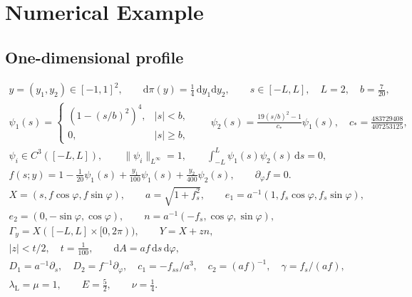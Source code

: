 \section{Numerical Example}
\label{sec:numerical-example}
\subsection{One-dimensional profile}
\begin{gather}
 y=(y_1,y_2)\in[-1,1]^2,\qquad
 \mathrm{d}\pi(y)=\tfrac14\,\mathrm{d}y_1\mathrm{d}y_2,
 \qquad s\in[-L,L],\quad L=2,\quad b=\tfrac7{20},\\
 \psi_1(s)=\begin{cases}(1-(s/b)^2)^4,&|s|<b,\\0,&|s|\ge b,\end{cases}
 \qquad
 \psi_2(s)=\frac{19(s/b)^2-1}{c_*}\psi_1(s),
 \quad c_*=\frac{483729408}{407253125},\\
 \psi_i\in C^3([-L,L]),\qquad
 \|\psi_i\|_{L^\infty}=1,\qquad
 \int_{-L}^{L}\psi_1(s)\psi_2(s)\,\mathrm{d}s=0,\\
 f(s;y)=1-\frac1{20}\psi_1(s)
       +\frac{y_1}{100}\psi_1(s)+\frac{y_2}{400}\psi_2(s),
 \qquad \partial_\varphi f=0.
 \label{eq:experiment-profile}
\end{gather}
\begin{gather}
 X=(s,f\cos\varphi,f\sin\varphi),\qquad
 a=\sqrt{1+f_s^2},\qquad
 e_1=a^{-1}(1,f_s\cos\varphi,f_s\sin\varphi),\\
 e_2=(0,-\sin\varphi,\cos\varphi),\qquad
 n=a^{-1}(-f_s,\cos\varphi,\sin\varphi),\\
 \Gamma_y=X([-L,L]\times[0,2\pi)),\qquad Y=X+zn,\\ |z|<t/2,\quad t=\tfrac1{100},\qquad
 \mathrm{d}A=af\,\mathrm{d}s\,\mathrm{d}\varphi,\\
 D_1=a^{-1}\partial_s,\quad D_2=f^{-1}\partial_\varphi,\quad
 c_1=-f_{ss}/a^3,\quad c_2=(af)^{-1},\quad \gamma=f_s/(af),\\
 \lambda_{\mathrm L}=\mu=1,\qquad E=\tfrac52,\qquad\nu=\tfrac14.
\end{gather}

